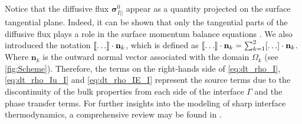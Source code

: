 Notice that the diffusive flux $\bm{\sigma}_{I||}^0$ appear as a quantity projected on the surface tangential plane.
Indeed, it can be shown that only the tangential parts of the diffusive flux plays a role in the surface momentum balance equations \citep{slattery2007interfacial,bothe2022sharp}.
We also introduced the notation $\llbracket \ldots \rrbracket \cdot \textbf{n}_k$, which is defined as $\llbracket \ldots \rrbracket \cdot \textbf{n}_k = \sum_{k=1}^2 [\ldots] \cdot \textbf{n}_k$.
Where $\textbf{n}_k$ is the outward normal vector associated with the domain $\Omega_k$ (see \ref{fig:Scheme}).
Therefore, the terms on the right-hands side of \ref{eq:dt_rho_I}, \ref{eq:dt_rho_Iu_I} and \ref{eq:dt_rho_IE_I} represent the source terms due to the discontinuity of the bulk properties from each side of the interface $\Gamma$ and the phase transfer terms. 
For further insights into the modeling of sharp interface thermodynamics, a comprehensive review may be found in \cite{bothe2022sharp}. 

